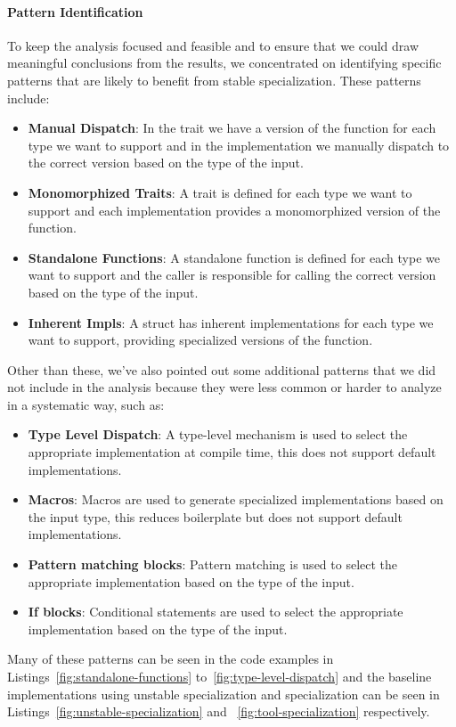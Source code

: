 \paragraph{Pattern Identification}
To keep the analysis focused and feasible and to ensure that we could draw meaningful conclusions from the results, we concentrated on identifying specific patterns that are likely to benefit from stable specialization.
These patterns include:
\begin{itemize}
	\item \textbf{Manual Dispatch}: In the trait we have a version of the function for each type we want to support and in the implementation we manually dispatch to the correct version based on the type of the input.
	\item \textbf{Monomorphized Traits}: A trait is defined for each type we want to support and each implementation provides a monomorphized version of the function.
	\item \textbf{Standalone Functions}: A standalone function is defined for each type we want to support and the caller is responsible for calling the correct version based on the type of the input.
	\item \textbf{Inherent Impls}: A struct has inherent implementations for each type we want to support, providing specialized versions of the function.
\end{itemize}
Other than these, we've also pointed out some additional patterns that we did not include in the analysis because they were less common or harder to analyze in a systematic way, such as:
\begin{itemize}
	\item \textbf{Type Level Dispatch}: A type-level mechanism is used to select the appropriate implementation at compile time, this does not support default implementations.
	\item \textbf{Macros}: Macros are used to generate specialized implementations based on the input type, this reduces boilerplate but does not support default implementations.
	\item \textbf{Pattern matching blocks}: Pattern matching is used to select the appropriate implementation based on the type of the input.
	\item \textbf{If blocks}: Conditional statements are used to select the appropriate implementation based on the type of the input.
\end{itemize}
Many of these patterns can be seen in the code examples in Listings~\ref{fig:standalone-functions} to~\ref{fig:type-level-dispatch} and the baseline implementations using unstable specialization and \mytool{} specialization can be seen in Listings~\ref{fig:unstable-specialization} and ~\ref{fig:tool-specialization} respectively.
